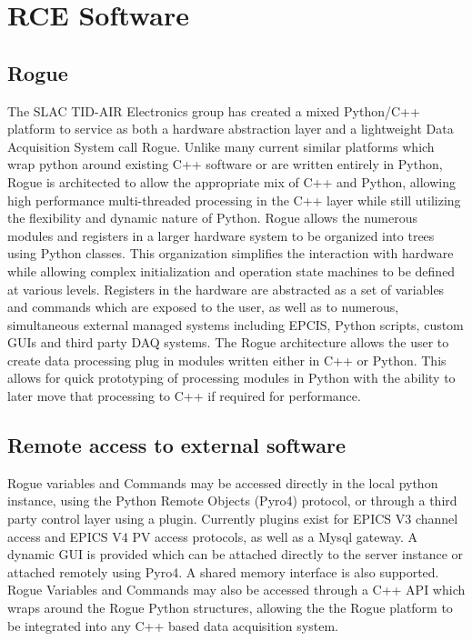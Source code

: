 \section{RCE Software}
\label{sec:software}
\subsection{Rogue}

The SLAC TID-AIR Electronics group has created a mixed Python/C++ platform to service as both a hardware abstraction layer and a lightweight Data Acquisition System call Rogue. Unlike many current similar platforms which wrap python around existing C++ software or are written entirely in Python, Rogue is architected to allow the appropriate mix of C++ and Python, allowing high performance multi-threaded processing in the C++ layer while still utilizing the flexibility and dynamic nature of Python. 
     Rogue allows the numerous modules and registers in a larger hardware system to be organized into trees using Python classes. This organization simplifies the interaction with hardware while allowing complex initialization and operation state machines to be defined at various levels. Registers in the hardware are abstracted as a set of variables and commands which are exposed to the user, as well as to numerous, simultaneous external managed systems including EPCIS, Python scripts, custom GUIs and third party DAQ systems.
     The Rogue architecture allows the user to create data processing plug in modules written either in C++ or Python. This allows for quick prototyping of processing modules in Python with the ability to later move that processing to C++ if required for performance.

\subsection{Remote access to external software}

Rogue variables and Commands may be accessed directly in the local python instance, using the Python Remote Objects (Pyro4) protocol, or through a third party control layer using a plugin. Currently plugins exist for EPICS V3 channel access and EPICS V4 PV access protocols, as well as a Mysql gateway. A dynamic GUI is provided which can be attached directly to the server instance or attached remotely using Pyro4. A shared memory interface is also supported.
     Rogue Variables and Commands may also be accessed through a C++ API which wraps around the Rogue Python structures, allowing the the Rogue platform to be integrated into any C++ based data acquisition system.

